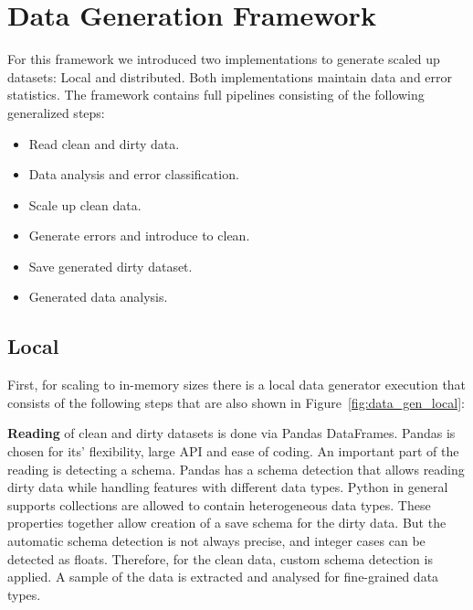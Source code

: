 \section{Data Generation Framework}
\label{sec:data_gen}
For this framework we introduced two implementations to generate scaled up datasets: Local and distributed.
Both implementations maintain data and error statistics. 
The framework contains full pipelines consisting of the following generalized steps:

\begin{itemize}
    \item Read clean and dirty data.
    \item Data analysis and error classification.
    \item Scale up clean data.
    \item Generate errors and introduce to clean.
    \item Save generated dirty dataset.
    \item Generated data analysis.
\end{itemize}

\subsection{Local}
\label{sec:local_generator}


First, for scaling to in-memory sizes there is a local data generator execution that consists of the following steps that are also shown in Figure~\ref{fig:data_gen_local}:


\textbf{Reading} of clean and dirty datasets is done via Pandas DataFrames. 
Pandas is chosen for its' flexibility, large API and ease of coding. 
An important part of the reading is detecting a schema.
Pandas has a schema detection that allows reading dirty data while handling features with different data types. 
Python in general supports collections are allowed to contain heterogeneous data types. 
These properties together allow creation of a save schema for the dirty data.
But the automatic schema detection is not always precise, and integer cases can be detected as floats. 
Therefore, for the clean data, custom schema detection is applied. A sample of the data is extracted and analysed for fine-grained data types. 


